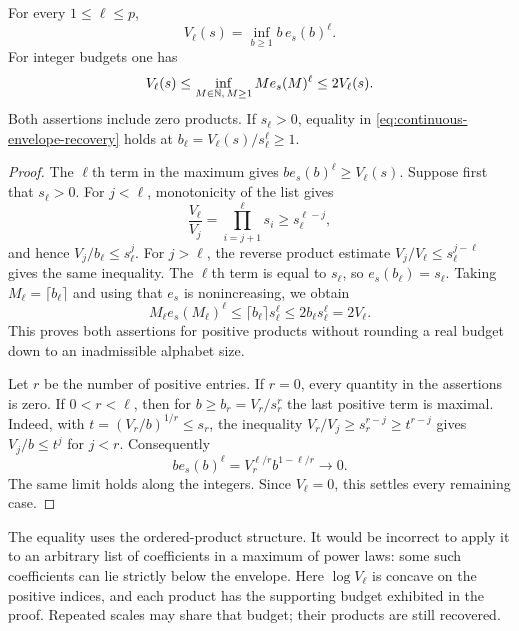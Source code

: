\begin{lemma}
\label{lem:integer-envelope-duality}
For every $1\le\ell\le p$,
\begin{equation}\label{eq:continuous-envelope-recovery}
 V_\ell(s)=\inf_{b\ge1}b\,e_s(b)^\ell.
\end{equation}
For integer budgets one has
\begin{equation}\label{eq:integer-envelope-recovery}
 V_\ell(s)\le
 \inf_{M\in\mathbb N,\,M\ge1}M e_s(M)^\ell
 \le2V_\ell(s).
\end{equation}
Both assertions include zero products. If $s_\ell>0$, equality in
\eqref{eq:continuous-envelope-recovery} holds at
$b_\ell=V_\ell(s)/s_\ell^\ell\ge1$.
\end{lemma}
\begin{proof}
The $\ell$th term in the maximum gives
$b e_s(b)^\ell\ge V_\ell(s)$. Suppose first that $s_\ell>0$.
For $j<\ell$, monotonicity of the list gives
\[
 \frac{V_\ell}{V_j}=\prod_{i=j+1}^{\ell}s_i
       \ge s_\ell^{\ell-j},
\]
and hence $V_j/b_\ell\le s_\ell^j$. For $j>\ell$, the reverse
product estimate $V_j/V_\ell\le s_\ell^{j-\ell}$ gives the same
inequality. The $\ell$th term is equal to $s_\ell$, so
$e_s(b_\ell)=s_\ell$. Taking $M_\ell=\lceil b_\ell\rceil$ and
using that $e_s$ is nonincreasing, we obtain
\[
 M_\ell e_s(M_\ell)^\ell
 \le\lceil b_\ell\rceil s_\ell^\ell
 \le2b_\ell s_\ell^\ell=2V_\ell.
\]
This proves both assertions for positive products without rounding a
real budget down to an inadmissible alphabet size.

Let $r$ be the number of positive entries. If $r=0$, every quantity
in the assertions is zero. If $0<r<\ell$, then for
$b\ge b_r=V_r/s_r^r$ the last positive term is maximal. Indeed,
with $t=(V_r/b)^{1/r}\le s_r$, the inequality
$V_r/V_j\ge s_r^{r-j}\ge t^{r-j}$ gives $V_j/b\le t^j$ for
$j<r$. Consequently
\[
 b e_s(b)^\ell=V_r^{\ell/r}b^{1-\ell/r}\longrightarrow0.
\]
The same limit holds along the integers. Since $V_\ell=0$, this
settles every remaining case.
\end{proof}

The equality uses the ordered-product structure. It would be incorrect
to apply it to an arbitrary list of coefficients in a maximum of power
laws: some such coefficients can lie strictly below the envelope. Here
$\log V_\ell$ is concave on the positive indices, and each product
has the supporting budget exhibited in the proof. Repeated scales may
share that budget; their products are still recovered.

